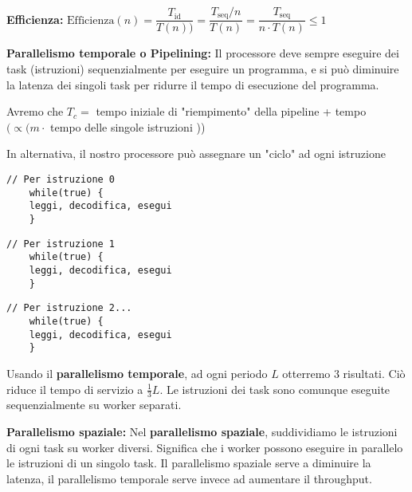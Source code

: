 \begin{defn}
	\textbf{Efficienza:}
	$ \text{Efficienza}(n) = \dfrac{T_{\text{id}}}{T(n))} =
	\dfrac{T_{\text{seq}}/n}{T(n)} = \dfrac{T_{\text{seq}}}{n \cdot T(n)} \leq 1
	$
\end{defn}


\begin{defn}
	\textbf{Parallelismo temporale o Pipelining:} Il processore deve sempre
	eseguire dei task (istruzioni) sequenzialmente per eseguire un programma, e
	si può diminuire la latenza dei singoli task per ridurre il tempo di
	esecuzione del programma.
	

	Avremo che $ T_c = $ tempo iniziale di "riempimento" della pipeline + tempo
	$ ( \propto ( m \cdot $ tempo delle singole istruzioni )) 

	In alternativa, il nostro processore può assegnare un "ciclo" ad ogni
	istruzione
	
	\begin{lstlisting}[frame=single]
	// Per istruzione 0
	while(true) {
	leggi, decodifica, esegui
	}
	\end{lstlisting} 
	\begin{lstlisting}[frame=single]
	// Per istruzione 1
	while(true) {
	leggi, decodifica, esegui
	}
	\end{lstlisting}
	\begin{lstlisting}[frame=single]
	// Per istruzione 2...
	while(true) {
	leggi, decodifica, esegui
	}
	\end{lstlisting} 
	
	
	Usando il \textbf{parallelismo temporale}, ad ogni periodo $ L $ otterremo 3
	risultati. Ciò riduce il tempo di servizio a $ \frac{1}{3}L $. Le istruzioni
	dei task sono comunque eseguite sequenzialmente su worker separati.
\end{defn}



\begin{defn}
	\textbf{Parallelismo spaziale:}
	Nel \textbf{parallelismo spaziale}, suddividiamo le istruzioni di ogni task
	su worker diversi. Significa che i worker possono eseguire in parallelo le
	istruzioni di un singolo task. Il parallelismo spaziale serve a diminuire la
	latenza, il parallelismo temporale serve invece ad aumentare il throughput.
	
\end{defn}

